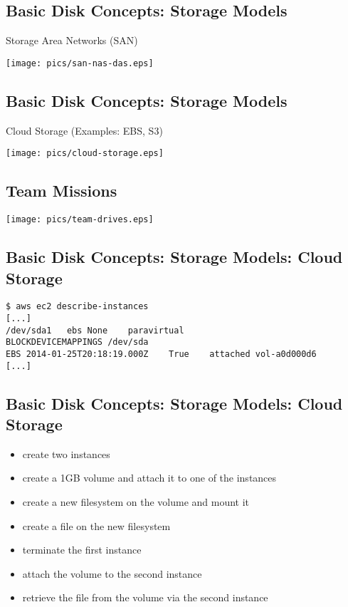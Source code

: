 \documentclass[xga]{xdvislides}
\begin{document}
\subsection{Basic Disk Concepts: Storage Models}
Storage Area Networks (SAN)
\vfill
\begin{center}
	\texttt{[image: pics/san-nas-das.eps]} \\
\end{center}
\vfill

\subsection{Basic Disk Concepts: Storage Models}
Cloud Storage (Examples: EBS, S3)
\vfill
\begin{center}
	\texttt{[image: pics/cloud-storage.eps]} \\
\end{center}
\vfill

\subsection{Team Missions}
\vfill
\begin{center}
	\texttt{[image: pics/team-drives.eps]} \\
\end{center}
\vfill

\subsection{Basic Disk Concepts: Storage Models: Cloud Storage}
\begin{verbatim}
$ aws ec2 describe-instances
[...]
/dev/sda1	ebs	None	paravirtual
BLOCKDEVICEMAPPINGS	/dev/sda
EBS	2014-01-25T20:18:19.000Z	True	attached vol-a0d000d6
[...]
\end{verbatim}


\subsection{Basic Disk Concepts: Storage Models: Cloud Storage}

\begin{itemize}
	\item create two instances
	\item create a 1GB volume and attach it to one of the instances
	\item create a new filesystem on the volume and mount it
	\item create a file on the new filesystem
	\item terminate the first instance
	\item attach the volume to the second instance
	\item retrieve the file from the volume via the second instance
\end{itemize}
\end{document}
